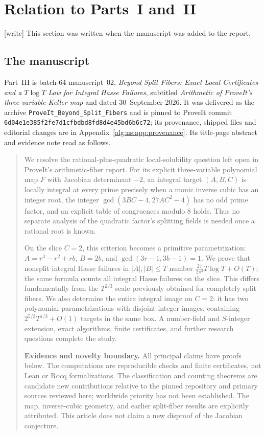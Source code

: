 \documentclass[11pt]{article}
\numberwithin{equation}{section}
\theoremstyle{plain}
\theoremstyle{plain}
\theoremstyle{plain}
\theoremstyle{definition}
\theoremstyle{definition}
\theoremstyle{definition}
\theoremstyle{remark}
\newcommand{\wtag}{\textup{[write]}}%
\newcommand{\nssha}{\nolinkurl{6d04e1e385f2fe7d1cfbdbd8fd8d4e45bd6b6c72}}
\begin{document}
\section{Relation to Parts~I and~II}\label{alg:ns:sec:relation}
\wtag{} This section was written when the manuscript was added to the
report.

\subsection{The manuscript}\label{alg:ns:sec:source}
Part~III is batch-64 manuscript~02, \emph{Beyond Split Fibers: Exact
Local Certificates and a $T\log T$ Law for Integral Hasse Failures},
subtitled \emph{Arithmetic of ProveIt's three-variable Keller map} and
dated 30~September 2026. It was delivered as the archive
\texttt{ProveIt\_Beyond\_Split\_Fibers} and is pinned to ProveIt commit
\nssha; its provenance, shipped files and editorial changes are in
Appendix~\ref{alg:ns:app:provenance}. Its title-page abstract and
evidence note read as follows.
\begin{quote}\small
We resolve the rational-plus-quadratic local-solubility question left open
in ProveIt's arithmetic-fiber report. For its explicit three-variable
polynomial map $F$ with Jacobian determinant $-2$, an integral target
$(A,B,C)$ is locally integral at every prime precisely when a monic inverse
cubic has an integer root, the integer
$\gcd(3BC-4,27AC^2-4)$ has no odd prime factor, and an explicit table of
congruences modulo $8$ holds. Thus no separate analysis of the quadratic
factor's splitting fields is needed once a rational root is known.

On the slice $C=2$, this criterion becomes a primitive parametrization:
$A=r^3-r^2+rb$, $B=2b$, and $\gcd(3r-1,3b-1)=1$.
We prove that nonsplit integral Hasse failures in $|A|,|B|\le T$ number
$\frac{27}{2\pi^2}T\log T+O(T)$; the same formula counts all integral
Hasse failures on the slice. This differs fundamentally from the
$T^{2/3}$ scale previously obtained for completely split fibers.
We also determine the entire integral image on $C=2$: it has two
polynomial parametrizations with disjoint integer images, containing
$2^{5/3}T^{1/3}+O(1)$ targets in the same box. A number-field and
$S$-integer extension, exact algorithms, finite certificates, and further
research questions complete the study.

\textbf{Evidence and novelty boundary.}
All principal claims have proofs below. The computations are reproducible
checks and finite certificates, not Lean or Rocq formalizations. The
classification and counting theorems are candidate new contributions
relative to the pinned repository and primary sources reviewed here;
worldwide priority has not been established. The map, inverse-cubic
geometry, and earlier split-fiber results are explicitly attributed.
This article does not claim a new disproof of the Jacobian conjecture.
\end{quote}
\end{document}
